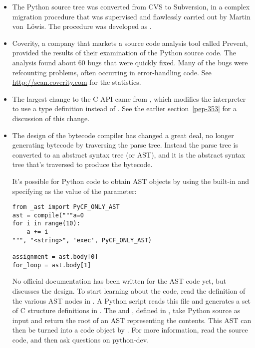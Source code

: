 \documentclass{howto}
\begin{document}
\begin{itemize}

\item The Python source tree was converted from CVS to Subversion, 
in a complex migration procedure that was supervised and flawlessly
carried out by Martin von~L\"owis.  The procedure was developed as
.

\item Coverity, a company that markets a source code analysis tool
called Prevent, provided the results of their examination of the Python
source code.  The analysis found about 60 bugs that 
were quickly fixed.  Many of the bugs were refcounting problems, often
occurring in error-handling code.  See
\url{http://scan.coverity.com} for the statistics.

\item The largest change to the C API came from ,
which modifies the interpreter to use a  type
definition instead of .  See the earlier
section~\ref{pep-353} for a discussion of this change.

\item The design of the bytecode compiler has changed a great deal, 
no longer generating bytecode by traversing the parse tree.  Instead
the parse tree is converted to an abstract syntax tree (or AST), and it is 
the abstract syntax tree that's traversed to produce the bytecode.

It's possible for Python code to obtain AST objects by using the 
 built-in and specifying 
as the value of the 
 parameter:

\begin{verbatim}
from _ast import PyCF_ONLY_AST
ast = compile("""a=0
for i in range(10):
    a += i
""", "<string>", 'exec', PyCF_ONLY_AST)

assignment = ast.body[0]
for_loop = ast.body[1]
\end{verbatim}

No official documentation has been written for the AST code yet, but
 discusses the design.  To start learning about the code, read the
definition of the various AST nodes in .  A
Python script reads this file and generates a set of C structure
definitions in .  The
 and
, defined in
, take Python source as input and return the
root of an AST representing the contents.  This AST can then be turned
into a code object by .  For more
information, read the source code, and then ask questions on
python-dev.


\end{itemize}
\end{document}
